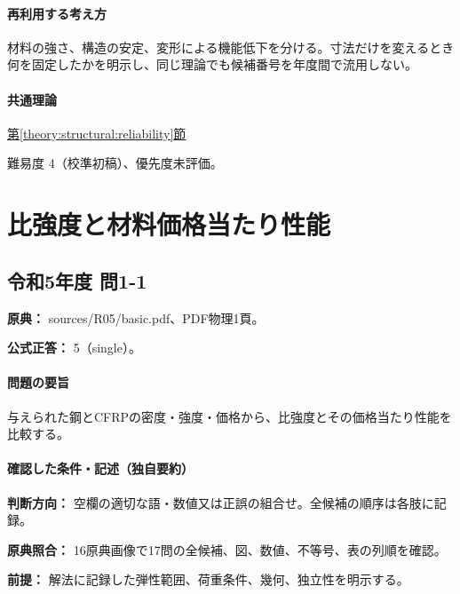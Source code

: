 \paragraph{再利用する考え方} 材料の強さ、構造の安定、変形による機能低下を分ける。寸法だけを変えるとき何を固定したかを明示し、同じ理論でも候補番号を年度間で流用しない。

\paragraph{共通理論} \hyperref[theory:structural:reliability]{第\ref*{theory:structural:reliability}節}

\par 難易度 4（校準初稿）、優先度未評価。

\section{比強度と材料価格当たり性能}

\subsection{令和5年度 問1-1}
\label{q:r05-reg-basic-1-1}

\noindent\textbf{原典：} sources/R05/basic.pdf、PDF物理1頁。

\textbf{公式正答：} 5（single）。

\paragraph{問題の要旨} 与えられた鋼とCFRPの密度・強度・価格から、比強度とその価格当たり性能を比較する。

\paragraph{確認した条件・記述（独自要約）}\mbox{}\par

\noindent\textbf{判断方向：} 空欄の適切な語・数値又は正誤の組合せ。全候補の順序は各肢に記録。\par

\noindent\textbf{原典照合：} 16原典画像で17問の全候補、図、数値、不等号、表の列順を確認。\par

\noindent\textbf{前提：} 解法に記録した弾性範囲、荷重条件、幾何、独立性を明示する。\par

